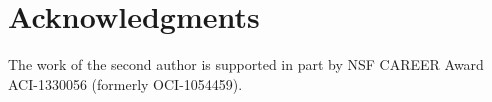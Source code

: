 \section{Acknowledgments}
The work of the second author is supported in part by NSF CAREER Award
ACI-1330056 (formerly OCI-1054459).
